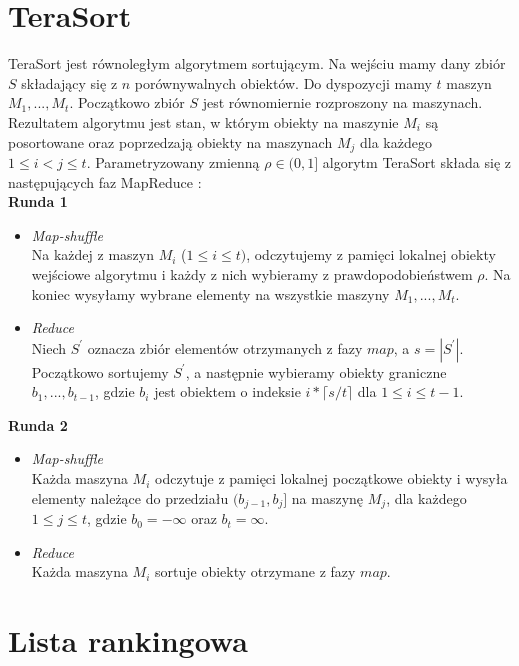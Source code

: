 \documentclass[licencjacka]{pracamgr}
\begin{document}
\section{TeraSort}

TeraSort jest równoległym algorytmem sortującym. Na wejściu mamy dany zbiór \(S\) składający się z \(n\) porównywalnych obiektów. Do dyspozycji mamy \(t\) maszyn \(M_1, ..., M_t\). Początkowo zbiór \(S\) jest równomiernie rozproszony na maszynach. Rezultatem algorytmu jest stan, w którym obiekty na maszynie \(M_i\) są posortowane oraz poprzedzają obiekty na maszynach \(M_j\) dla każdego \(1 \leq i < j \leq t\). Parametryzowany zmienną \(\rho \in (0, 1]\) algorytm TeraSort składa się z następujących faz MapReduce \cite{tao2013minimal}: \\

\textbf{Runda 1}
\begin{itemize}
    \item \textit{Map-shuffle} \\
    Na każdej z maszyn \(M_i\) (\(1 \leq i \leq t)\), odczytujemy z pamięci lokalnej obiekty wejściowe algorytmu i każdy z nich wybieramy z prawdopodobieństwem \(\rho\). Na koniec wysyłamy wybrane elementy na wszystkie maszyny \(M_1, ..., M_t\).
    \item \textit{Reduce} \\
    Niech \(S^{\prime}\) oznacza zbiór elementów otrzymanych z fazy \(map\), a \(s = |S^{\prime}|\). Początkowo sortujemy \(S^{\prime}\), a następnie wybieramy obiekty graniczne \(b_1, ..., b_{t-1}\), gdzie \(b_i\) jest obiektem o indeksie \(i*\lceil{s / t}\rceil\) dla \(1 \leq i \leq t-1\).
\end{itemize}

\textbf{Runda 2}
\begin{itemize}
    \item \textit{Map-shuffle} \\
    Każda maszyna \(M_i\) odczytuje z pamięci lokalnej początkowe obiekty i wysyła elementy należące do przedziału \((b_{j-1}, b_j]\) na maszynę \(M_j\), dla każdego \(1 \leq j \leq t\), gdzie \(b_0 = -\infty\) oraz \(b_t = \infty\).
    \item \textit{Reduce} \\
    Każda maszyna \(M_i\) sortuje obiekty otrzymane z fazy \(map\).
\end{itemize}


\section{Lista rankingowa}
\end{document}
